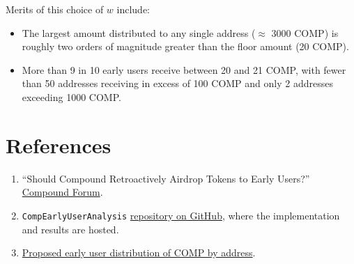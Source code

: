 \documentclass[12pt]{article}
\begin{document}
Merits of this choice of $w$ include:
\begin{itemize}
  \item{The largest amount distributed to any single address ($\approx$ 3000 COMP) is roughly two orders of magnitude greater than the floor amount (20 COMP).}
  \item{More than 9 in 10 early users receive between 20 and 21 COMP, with fewer than 50 addresses receiving in excess of 100 COMP and only 2 addresses exceeding 1000 COMP.}
\end{itemize}

\section{References}
\begin{enumerate}
  \item{``Should Compound Retroactively Airdrop Tokens to Early Users?'' \href{https://www.comp.xyz/t/should-compound-retroactively-airdrop-tokens-to-early-users/595}{Compound Forum}.}
  \item{\texttt{CompEarlyUserAnalysis} \href{https://github.com/0xA1176ec01045/CompEarlyUserAnalysis}{repository on GitHub}, where the implementation and results are hosted.}
  \item{\href{https://raw.githubusercontent.com/0xA1176ec01045/CompEarlyUserAnalysis/main/proposals/Proposal.95-5.csv}{Proposed early user distribution of COMP by address}.}
\end{enumerate}
\end{document}
